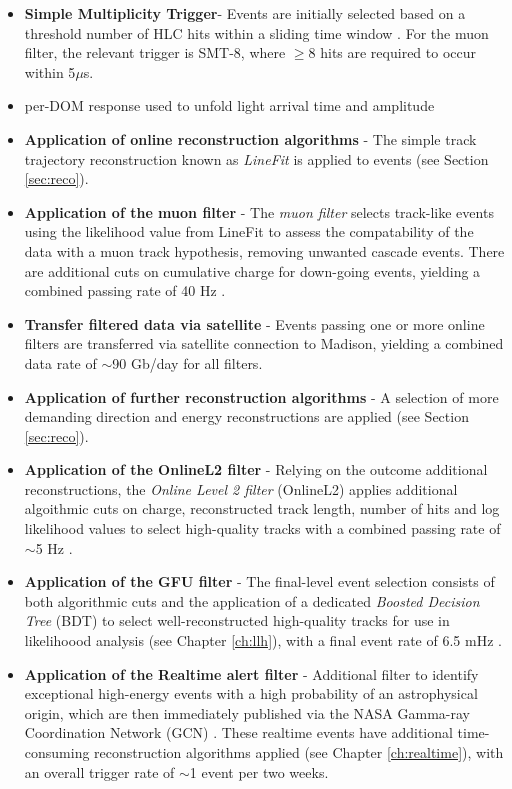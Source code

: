 \begin{itemize}
	\item \textbf{Simple Multiplicity Trigger}- Events are initially selected based on a threshold number of HLC hits within a sliding time window \cite{icecube_detector_17}. For the muon filter, the relevant trigger is SMT-8, where $\geq$8 hits are required to occur within 5$\mu$s.
	\item per-DOM response used to unfold light arrival time and amplitude
	\item \textbf{Application of online reconstruction algorithms} - The simple track trajectory reconstruction known as \emph{LineFit} is applied to events (see Section \ref{sec:reco}).
	\item \textbf{Application of the muon filter} - The \emph{muon filter} selects track-like events using the likelihood value from LineFit to assess the compatability of the data with a muon track hypothesis, removing unwanted cascade events. There are additional cuts on cumulative charge for down-going events, yielding a combined passing rate of 40 Hz \cite{kintscher_thesis}.
	\item \textbf{Transfer filtered data via satellite } - Events passing one or more online filters are transferred via satellite connection to Madison, yielding a combined data rate of $\sim$90 Gb/day for all filters.
	\item \textbf{Application of further reconstruction algorithms} - A selection of more demanding direction and energy reconstructions are applied (see Section \ref{sec:reco}).
	\item \textbf{Application of the OnlineL2 filter} - Relying on the outcome additional reconstructions, the \emph{Online Level 2 filter} (OnlineL2) applies additional algoithmic cuts on charge, reconstructed track length, number of hits and log likelihood values to select high-quality tracks with a combined passing rate of $\sim$5 Hz .	
	\item \textbf{Application of the GFU filter} - The final-level event selection consists of both algorithmic cuts and the application of a dedicated \emph{Boosted Decision Tree} (BDT) to select well-reconstructed high-quality tracks for use in likelihoood analysis (see Chapter \ref{ch:llh}), with a final event rate of 6.5 mHz \cite{kintscher_thesis}.
	\item \textbf{Application of the Realtime alert filter} - Additional filter to identify exceptional high-energy events with a high probability of an astrophysical origin, which are then immediately published via the NASA Gamma-ray Coordination Network (GCN) . These realtime events have additional time-consuming reconstruction algorithms applied (see Chapter \ref{ch:realtime}), with an overall trigger rate of $\sim$1 event per two weeks.
\end{itemize}

